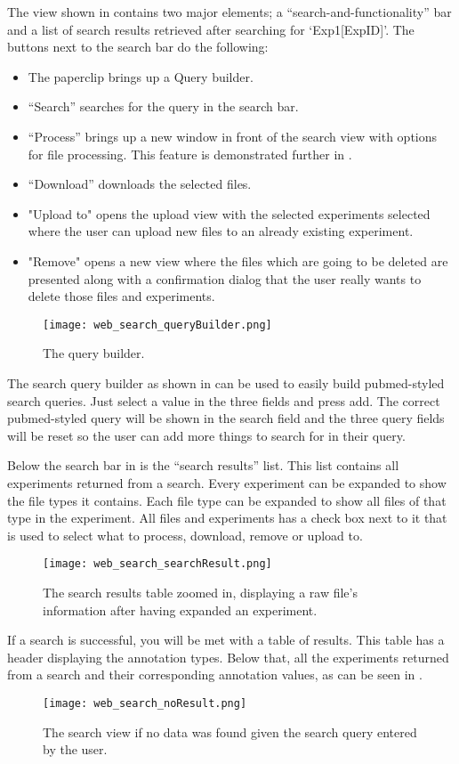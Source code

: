 The view shown in  contains two major elements; a “search-and-functionality” bar and a list of search results retrieved after searching for ‘Exp1[ExpID]’. The buttons next to the search bar do the following: 
\begin{itemize}
	\item The paperclip brings up a Query builder.
	\item “Search” searches for the query in the search bar. 
	\item “Process” brings up a new window in front of the search view with options for file processing. This feature is demonstrated further in .
    \item “Download” downloads the selected files. 
    \item "Upload to" opens the upload view with the selected experiments selected where the user can upload new files to an already existing experiment.
    \item "Remove" opens a new view where the files which are going to be deleted are presented along with a confirmation dialog that the user really wants to delete those files and experiments.
\end{itemize}
\begin{figure}[h]
\centering
\texttt{[image: web\_search\_queryBuilder.png]}
\caption{\label{fig:web_search_queryBuilder}The query builder.}
\end{figure}
The search query builder as shown in  can be used to easily build pubmed-styled search queries. Just select a value in the three fields and press add. The correct pubmed-styled query will be shown in the search field and the three query fields will be reset so the user can add more things to search for in their query.

Below the search bar in  is the “search results” list. This list contains all experiments returned from a search. Every experiment can be expanded to show the file types it contains. Each file type can be expanded to show all files of that type in the experiment. All files and experiments has a check box next to it that is used to select what to process, download, remove or upload to.
\begin{figure}[h]
\centering
\texttt{[image: web\_search\_searchResult.png]}
\caption{\label{fig:web_search_searchResult}The search results table zoomed in, displaying a raw file’s information after having expanded an experiment.}
\end{figure}
\FloatBarrier
If a search is successful, you will be met with a table of results. This table has a header displaying the annotation types. Below that, all the experiments returned from a search and their corresponding annotation values, as can be seen in .
\begin{figure}[h]
\centering
\texttt{[image: web\_search\_noResult.png]}
\caption{\label{fig:web_search_noResult}The search view if no data was found given the search query entered by the user.}
\end{figure}
\FloatBarrier

